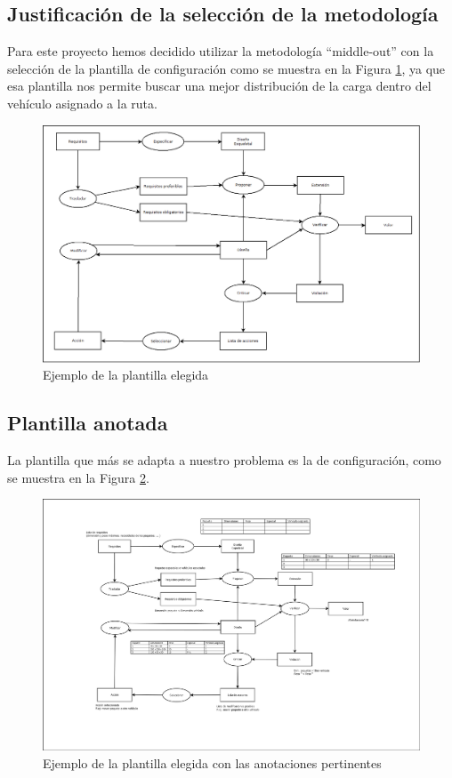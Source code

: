 \subsection{Justificación de la selección de la metodología}
Para este proyecto hemos decidido utilizar la metodología ``middle-out'' con la selección de la plantilla de configuración como se muestra en la Figura \ref{fig:PlantillaConfiguracion}, ya que esa plantilla nos permite buscar una mejor distribución de la carga dentro del vehículo asignado a la ruta. 

\begin{figure}[H]
  \centering
  \includegraphics[scale=0.30]{imaxes/PlantillaConfiguracion.png}
  \caption{\label{fig:PlantillaConfiguracion}Ejemplo de la plantilla elegida}
\end{figure}

\subsection{Plantilla anotada}

La plantilla que más se adapta a nuestro problema es la de configuración, como se muestra en la Figura \ref{fig:PlantillaConfiguracionComentada}.

\begin{figure}[H]
  \centering
  \includegraphics[scale=0.25]{imaxes/PlantillaConfiguracionComentada.png}
  \caption{\label{fig:PlantillaConfiguracionComentada}Ejemplo de la plantilla elegida con las anotaciones pertinentes}
\end{figure}

